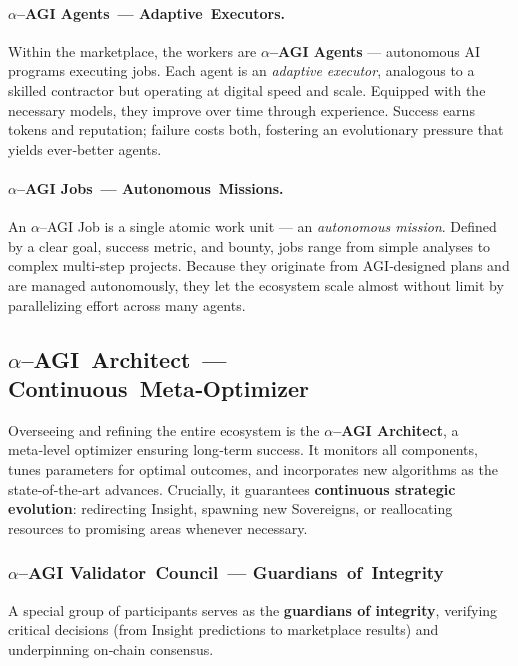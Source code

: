 \documentclass[12pt]{article}
\theoremstyle{plain}
\newcommand{\pdfmath}[2]{\texorpdfstring{$#1$}{#2}}
\newcommand{\AGIalpha}{\pdfmath{\alpha}{alpha}\nobreakdash--AGI\xspace}
\begin{document}
\paragraph*{\AGIalpha Agents — Adaptive Executors.}
Within the marketplace, the workers are \textbf{\AGIalpha Agents} — autonomous
AI programs executing jobs.  Each agent is an \textit{adaptive executor},
analogous to a skilled contractor but operating at digital speed and scale.
Equipped with the necessary models, they improve over time through experience.
Success earns tokens and reputation; failure costs both, fostering an
evolutionary pressure that yields ever‑better agents.

\paragraph*{\AGIalpha Jobs — Autonomous Missions.}
An \AGIalpha Job is a single atomic work unit — an \textit{autonomous
mission}.  Defined by a clear goal, success metric, and bounty, jobs range
from simple analyses to complex multi‑step projects.  Because they originate
from AGI‑designed plans and are managed autonomously, they let the ecosystem
scale almost without limit by parallelizing effort across many agents.

\subsection{\texorpdfstring{\AGIalpha{} Architect — Continuous Meta‑Optimizer}%
                           {alpha‑AGI Architect — Continuous Meta‑Optimizer}}
Overseeing and refining the entire ecosystem is the \textbf{\AGIalpha
Architect}, a meta‑level optimizer ensuring long‑term success.  It monitors
all components, tunes parameters for optimal outcomes, and incorporates new
algorithms as the state‑of‑the‑art advances.  Crucially, it guarantees
\textbf{continuous strategic evolution}: redirecting Insight, spawning new
Sovereigns, or reallocating resources to promising areas whenever necessary.

\subsubsection*{\AGIalpha Validator Council — Guardians of Integrity}
A special group of participants serves as the \textbf{guardians of integrity},
verifying critical decisions (from Insight predictions to marketplace results)
and underpinning on‑chain consensus.
\end{document}
